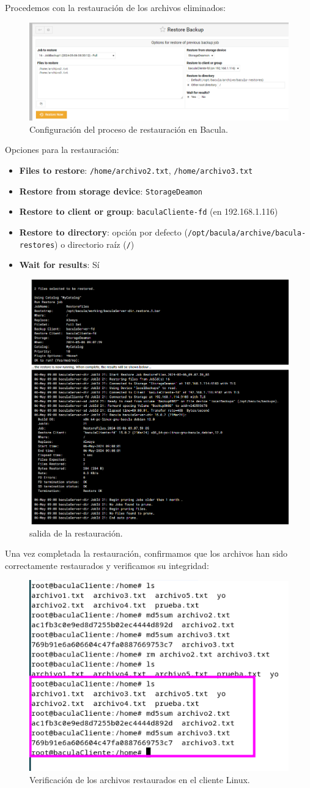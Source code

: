 Procedemos con la restauración de los archivos eliminados:
\begin{figure}[H]
    \centering
    \includegraphics[width=0.5\linewidth]{instalacionBacula/resBackup.png}
    \caption{Configuración del proceso de restauración en Bacula.}
\end{figure}

Opciones para la restauración:
\begin{itemize}
    \item \textbf{Files to restore}: \texttt{/home/archivo2.txt}, \texttt{/home/archivo3.txt}
    \item \textbf{Restore from storage device}: \texttt{StorageDeamon}
    \item \textbf{Restore to client or group}: \texttt{baculaCliente-fd} (en 192.168.1.116)
    \item \textbf{Restore to directory}: opción por defecto (\texttt{/opt/bacula/archive/bacula-restores}) o directorio raíz (\texttt{/})
    \item \textbf{Wait for results}: Sí
\end{itemize}

\begin{figure}[H]
    \centering
    \includegraphics[width=0.5\linewidth]{instalacionBacula/restoresalidawebmin.png}
    \caption{salida de la restauración.}
\end{figure}

Una vez completada la restauración, confirmamos que los archivos han sido correctamente restaurados y verificamos su integridad:
\begin{figure}[H]
    \centering
    \includegraphics[width=0.5\linewidth]{instalacionBacula/restoreSusc.png}
    \caption{Verificación de los archivos restaurados en el cliente Linux.}
\end{figure}
